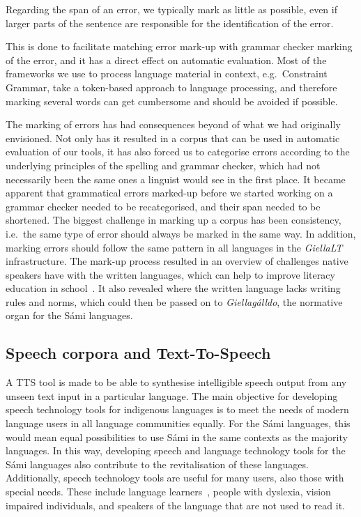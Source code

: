 \documentclass[free]{flammie}
\begin{document}
Regarding the span of an error, we typically mark as little as possible, even if
larger parts of the sentence are responsible for the identification of the
error.

This is done to facilitate matching error mark-up with grammar checker marking
of the error, and it has a direct effect on automatic evaluation.  Most of the
frameworks we use to process language material in context, e.g.\ Constraint
Grammar, take a token-based approach to language processing, and therefore
marking several words can get cumbersome and should be avoided if possible.







The marking of errors has had consequences beyond of what we had originally
envisioned.  Not only has it resulted in a corpus that can be used in automatic
evaluation of our tools, it has also forced us to categorise errors according to
the underlying principles of the spelling and grammar checker, which had not
necessarily been the same ones a linguist would see in the first place. It
became apparent that grammatical errors marked-up before we started working on a
grammar checker needed to be recategorised, and their span needed to be
shortened.  The biggest challenge in marking up a corpus has been consistency,
i.e.\ the same type of error should always be marked in the same way. In
addition, marking errors should follow the same pattern in all languages in the
\textit{GiellaLT} infrastructure.  The mark-up process resulted in an overview
of challenges native speakers have with the written languages, which can help to
improve literacy education in school~\cite{Antonsen2012improving}.  It also
revealed where the written language lacks writing rules and norms, which could
then be passed on to \textit{Giellagálldo}, the normative organ for the Sámi
languages.






\subsection{Speech corpora and Text-To-Speech}


A TTS tool is made to be able to synthesise intelligible speech output from any
unseen text input in a particular language. The main objective for developing
speech technology tools for indigenous languages is to meet the needs of modern
language users in all language communities equally. For the Sámi languages, this
would mean equal possibilities to use Sámi in the same contexts as the majority
languages. In this way, developing speech and language technology tools for the
Sámi languages also contribute to the revitalisation of these languages.
Additionally, speech technology tools are useful for many users, also those with
special needs. These include language learners~\cite{yaneva2021speech}, people
with dyslexia, vision impaired individuals, and speakers of the language that
are not used to read it.
\end{document}
